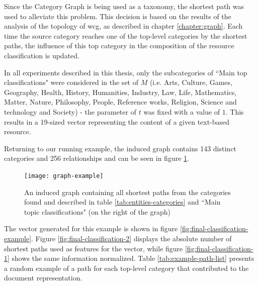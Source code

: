 Since the Category Graph is being used as a taxonomy, the shortest path was used to alleviate this problem. This decision is based on the results of the analysis of the topology of \gls{wcg}, as described in chapter \ref{chapter:graph}. Each time the source category reaches one of the top-level categories by the shortest paths, the influence of this top category in the composition of the resource classification is updated. 

In all experiments described in this thesis, only the subcategories of ``Main top classifications" were considered in the set of $M$ (i.e. Arts, Culture, Games, Geography, Health, History, Humanities, Industry, Law, Life, Mathematics, Matter, Nature, Philosophy, People, Reference works, Religion, Science and technology and Society) -  the parameter of  $t$ was fixed with a value of $1$. This results in a 19-sized vector representing the content of a given text-based resource.

Returning to our running example, the induced graph contains 143 distinct categories and 256 relationships and can be seen in figure \ref{fig:graph-example}.

 
\begin{figure}[H]
  \texttt{[image: graph-example]}
  \caption{An induced graph containing all shortest paths from the categories found and described in table \ref{tab:entities-categories} and ``Main topic classifications" (on the right of the graph)}
  \label{fig:graph-example}
\end{figure}


The vector generated for this example is shown in figure \ref{fig:final-classification-example}. Figure \ref{fig:final-classification-2} displays the absolute number of shortest paths used as features for the vector, while figure \ref{fig:final-classification-1} shows the same information normalized. Table \ref{tab:example-path-list} presents a random example of a path for each top-level category that contributed to the document representation.

